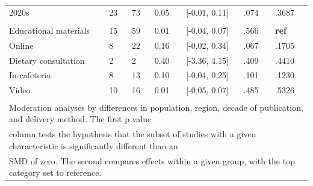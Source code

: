 \documentclass[sn-nature,referee,pdflatex]{sn-jnl}
\begin{document}
\begin{table}[!h]
\begin{tabular}[t]{lllllll}
\hspace{1em}2020s & 23 & 73 & 0.05 & {}[-0.01, 0.11] & .074 & .3687\\
\addlinespace[0.3em]
\multicolumn{7}{l}{\textbf{Method of Delivery}}\\
\hspace{1em}Educational materials & 15 & 59 & 0.01 & {}[-0.04, 0.07] & .566 & \textbf{ref}\\
\hspace{1em}Online & 8 & 22 & 0.16 & {}[-0.02, 0.34] & .067 & .1705\\
\hspace{1em}Dietary consultation & 2 & 2 & 0.40 & {}[-3.36, 4.15] & .409 & .4410\\
\hspace{1em}In-cafeteria & 8 & 13 & 0.10 & {}[-0.04, 0.25] & .101 & .1230\\
\hspace{1em}Video & 10 & 16 & 0.01 & {}[-0.05, 0.07] & .485 & .5326\\
\bottomrule
\multicolumn{7}{l}{\textsuperscript{} Moderation analyses by differences in population, region, decade of publication, and delivery method. The first p value}\\
\multicolumn{7}{l}{column tests the hypothesis that the subset of studies with a given characteristic is significantly different than an}\\
\multicolumn{7}{l}{SMD of zero. The second compares effects within a given group, with the top category set to reference.}\\
\end{tabular}
\end{table}
\end{document}
